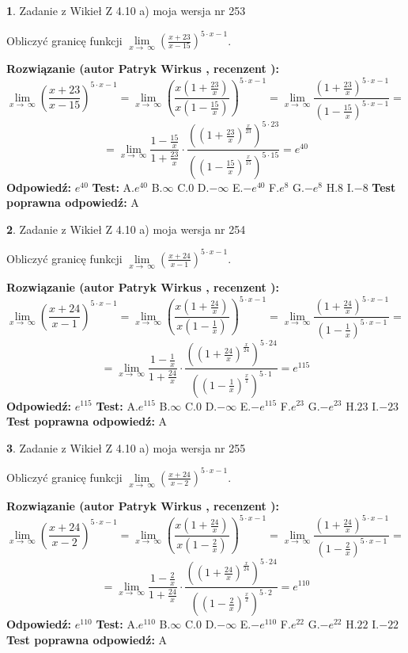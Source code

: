 \documentclass[12pt, a4paper]{article}
\theoremstyle{definition} %
\newtheorem{zad}{}
\newcommand{\zadStart}[1]{\begin{zad}#1\newline}
\newcommand{\zadStop}{\end{zad}}
\newcommand{\rozwStart}[2]{\noindent \textbf{Rozwiązanie (autor #1 , recenzent #2): }\newline}
\newcommand{\rozwStop}{\newline}
\newcommand{\odpStart}{\noindent \textbf{Odpowiedź:}\newline}
\newcommand{\odpStop}{\newline}
\newcommand{\testStart}{\noindent \textbf{Test:}\newline}
\newcommand{\testStop}{\newline}
\newcommand{\kluczStart}{\noindent \textbf{Test poprawna odpowiedź:}\newline}
\newcommand{\kluczStop}{\newline}
\begin{document}
\zadStart{Zadanie z Wikieł Z 4.10 a) moja wersja nr 253}

Obliczyć granicę funkcji  $\lim\limits_{x\to\ \infty}(\frac{x+23}{x-15})^{5\cdot x-1}$.
\zadStop
\rozwStart{Patryk Wirkus}{}
$$\lim\limits_{x\to\ \infty}(\frac{x+23}{x-15})^{5\cdot x-1} = \lim\limits_{x\to\ \infty}(\frac{x(1+\frac{23}{x})}{x(1-\frac{15}{x})})^{5\cdot x-1}=\lim\limits_{x\to\ \infty}\frac{(1+\frac{23}{x})^{5\cdot x-1}}{(1-\frac{15}{x})^{5\cdot x-1}}=$$
$$=\lim\limits_{x\to\ \infty}\frac{1-\frac{15}{x}}{1+\frac{23}{x}}\cdot\frac{((1+\frac{23}{x})^{\frac{x}{23}})^{5\cdot23}}{((1-\frac{15}{x})^{\frac{x}{15}})^{5\cdot15}}=e^{40}$$
\rozwStop
\odpStart
$e^{40}$
\odpStop
\testStart
A.$e^{40}$ B.$\infty$ C.$0$ D.$-\infty$ E.$-e^{40}$
F.$e^{8}$ G.$-e^{8}$
H.$8$
I.$-8$
\testStop
\kluczStart
A
\kluczStop



\zadStart{Zadanie z Wikieł Z 4.10 a) moja wersja nr 254}

Obliczyć granicę funkcji  $\lim\limits_{x\to\ \infty}(\frac{x+24}{x-1})^{5\cdot x-1}$.
\zadStop
\rozwStart{Patryk Wirkus}{}
$$\lim\limits_{x\to\ \infty}(\frac{x+24}{x-1})^{5\cdot x-1} = \lim\limits_{x\to\ \infty}(\frac{x(1+\frac{24}{x})}{x(1-\frac{1}{x})})^{5\cdot x-1}=\lim\limits_{x\to\ \infty}\frac{(1+\frac{24}{x})^{5\cdot x-1}}{(1-\frac{1}{x})^{5\cdot x-1}}=$$
$$=\lim\limits_{x\to\ \infty}\frac{1-\frac{1}{x}}{1+\frac{24}{x}}\cdot\frac{((1+\frac{24}{x})^{\frac{x}{24}})^{5\cdot24}}{((1-\frac{1}{x})^{\frac{x}{1}})^{5\cdot1}}=e^{115}$$
\rozwStop
\odpStart
$e^{115}$
\odpStop
\testStart
A.$e^{115}$ B.$\infty$ C.$0$ D.$-\infty$ E.$-e^{115}$
F.$e^{23}$ G.$-e^{23}$
H.$23$
I.$-23$
\testStop
\kluczStart
A
\kluczStop



\zadStart{Zadanie z Wikieł Z 4.10 a) moja wersja nr 255}

Obliczyć granicę funkcji  $\lim\limits_{x\to\ \infty}(\frac{x+24}{x-2})^{5\cdot x-1}$.
\zadStop
\rozwStart{Patryk Wirkus}{}
$$\lim\limits_{x\to\ \infty}(\frac{x+24}{x-2})^{5\cdot x-1} = \lim\limits_{x\to\ \infty}(\frac{x(1+\frac{24}{x})}{x(1-\frac{2}{x})})^{5\cdot x-1}=\lim\limits_{x\to\ \infty}\frac{(1+\frac{24}{x})^{5\cdot x-1}}{(1-\frac{2}{x})^{5\cdot x-1}}=$$
$$=\lim\limits_{x\to\ \infty}\frac{1-\frac{2}{x}}{1+\frac{24}{x}}\cdot\frac{((1+\frac{24}{x})^{\frac{x}{24}})^{5\cdot24}}{((1-\frac{2}{x})^{\frac{x}{2}})^{5\cdot2}}=e^{110}$$
\rozwStop
\odpStart
$e^{110}$
\odpStop
\testStart
A.$e^{110}$ B.$\infty$ C.$0$ D.$-\infty$ E.$-e^{110}$
F.$e^{22}$ G.$-e^{22}$
H.$22$
I.$-22$
\testStop
\kluczStart
A
\kluczStop
\end{document}
